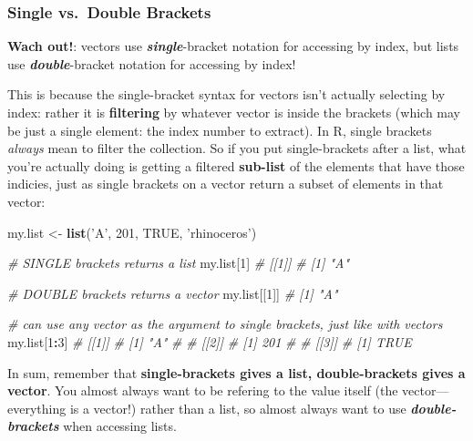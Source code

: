 \documentclass[]{book}
\newenvironment{Shaded}{\begin{snugshade}}{\end{snugshade}}
\newcommand{\KeywordTok}[1]{\textcolor[rgb]{0.13,0.29,0.53}{\textbf{#1}}}
\newcommand{\DecValTok}[1]{\textcolor[rgb]{0.00,0.00,0.81}{#1}}
\newcommand{\StringTok}[1]{\textcolor[rgb]{0.31,0.60,0.02}{#1}}
\newcommand{\CommentTok}[1]{\textcolor[rgb]{0.56,0.35,0.01}{\textit{#1}}}
\newcommand{\OtherTok}[1]{\textcolor[rgb]{0.56,0.35,0.01}{#1}}
\newcommand{\OperatorTok}[1]{\textcolor[rgb]{0.81,0.36,0.00}{\textbf{#1}}}
\newcommand{\NormalTok}[1]{#1}
\theoremstyle{definition}
\theoremstyle{definition}
\theoremstyle{remark}
\begin{document}
\subsubsection{Single vs.~Double
Brackets}\label{single-vs.double-brackets}

\textbf{Wach out!}: vectors use \textbf{\emph{single}}-bracket notation
for accessing by index, but lists use \textbf{\emph{double}}-bracket
notation for accessing by index!

This is because the single-bracket syntax for vectors isn't actually
selecting by index: rather it is \textbf{filtering} by whatever vector
is inside the brackets (which may be just a single element: the index
number to extract). In R, single brackets \emph{always} mean to filter
the collection. So if you put single-brackets after a list, what you're
actually doing is getting a filtered \textbf{sub-list} of the elements
that have those indicies, just as single brackets on a vector return a
subset of elements in that vector:

\begin{Shaded}
\begin{Highlighting}[]
\NormalTok{my.list <-}\StringTok{ }\KeywordTok{list}\NormalTok{(}\StringTok{'A'}\NormalTok{, }\DecValTok{201}\NormalTok{, }\OtherTok{TRUE}\NormalTok{, }\StringTok{'rhinoceros'}\NormalTok{)}

\CommentTok{# SINGLE brackets returns a list}
\NormalTok{my.list[}\DecValTok{1}\NormalTok{]}
            \CommentTok{# [[1]]}
            \CommentTok{# [1] "A"}

\CommentTok{# DOUBLE brackets returns a vector}
\NormalTok{my.list[[}\DecValTok{1}\NormalTok{]]  }\CommentTok{# [1] "A"}

\CommentTok{# can use any vector as the argument to single brackets, just like with vectors}
\NormalTok{my.list[}\DecValTok{1}\OperatorTok{:}\DecValTok{3}\NormalTok{]}
            \CommentTok{# [[1]]}
            \CommentTok{# [1] "A"}
            \CommentTok{#}
            \CommentTok{# [[2]]}
            \CommentTok{# [1] 201}
            \CommentTok{#}
            \CommentTok{# [[3]]}
            \CommentTok{# [1] TRUE}
\end{Highlighting}
\end{Shaded}

In sum, remember that \textbf{single-brackets gives a list,
double-brackets gives a vector}. You almost always want to be refering
to the value itself (the vector---everything is a vector!) rather than a
list, so almost always want to use \textbf{\emph{double-brackets}} when
accessing lists.
\end{document}
